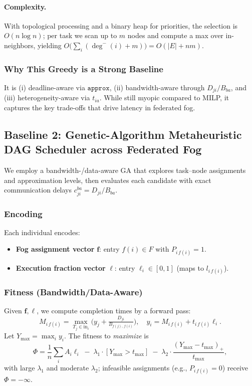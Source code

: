 \paragraph{Complexity.} With topological processing and a binary heap for priorities, the selection is \(O(n\log n)\); per task we scan up to \(m\) nodes and compute a max over in-neighbors, yielding \(O\!\big(\sum_i (\deg^-(i)+m)\big)=O(|E|+nm)\).

\subsubsection{Why This Greedy is a Strong Baseline}
It is (i) deadline-aware via \(\texttt{approx}\), (ii) bandwidth-aware through \(D_{ji}/B_{ba}\), and (iii) heterogeneity-aware via \(t_{ia}\). While still myopic compared to MILP, it captures the key trade-offs that drive latency in federated fog.

\subsection{Baseline 2: Genetic-Algorithm Metaheuristic DAG Scheduler across Federated Fog}
\label{sec:baseline-ga}

We employ a bandwidth-/data-aware GA that explores task--node assignments and approximation levels, then evaluates each candidate with exact communication delays \(c_{ji}^{ba}=D_{ji}/B_{ba}\).

\subsubsection{Encoding}
Each individual encodes:
\begin{itemize}[leftmargin=*]
    \item \textbf{Fog assignment vector} \(\mathbf{f}\): entry \(f(i)\in F\) with \(P_{i\,f(i)}=1\).
    \item \textbf{Execution fraction vector} \(\boldsymbol{\ell}\): entry \(\ell_i\in[0,1]\) (maps to \(l_{i\,f(i)}\)).
\end{itemize}

\subsubsection{Fitness (Bandwidth/Data-Aware)}
Given \(\mathbf{f},\boldsymbol{\ell}\), we compute completion times by a forward pass:
\[
M_{i\,f(i)}=\max_{T_j\in \text{in}_i}\!\Big(y_j+\tfrac{D_{ji}}{B_{f(j),\,f(i)}}\Big),\quad
y_i=M_{i\,f(i)}+t_{i\,f(i)}\ell_i.
\]
Let \(Y_{\max}=\max_i y_i\). The fitness to \emph{maximize} is
\[
\Phi=\frac{1}{n}\sum_i A_i \ell_i\;-\;\lambda_1\!\cdot\![Y_{\max}>t_{\max}]\;-\;\lambda_2\!\cdot\!\frac{(Y_{\max}-t_{\max})_+}{t_{\max}},
\]
with large \(\lambda_1\) and moderate \(\lambda_2\); infeasible assignments (e.g., \(P_{i\,f(i)}=0\)) receive \(\Phi=-\infty\).

